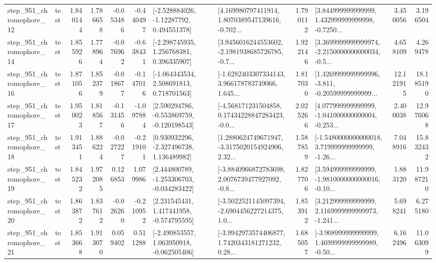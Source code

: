 \begin{tabular}{llrrrrllrlrr}
  step\_951\_chromophore\_12 &      test &      1.840144 &    1.786658 &     -0.053486 & -0.440497 &    [-2.528884026, -1.12287792, 0.494551378] &  [4.169980797411914, 1.8070389547139616, -0.702... &       1.790112 &  [3.844999999999999, 1.432999999999998, -0.7250... &            3.450056 &          3.196504 \\
  step\_951\_chromophore\_14 &      test &      1.855926 &    1.778964 &     -0.076962 & -0.638431 &    [-2.298745935, 1.256768381, 0.396335907] &  [3.9456016244553602, -2.1981938685726785, -0.7... &       1.922146 &  [3.3699999999999974, -2.2150000000000034, -0.5... &            4.658109 &          4.269478 \\
  step\_951\_chromophore\_16 &      test &      1.871056 &    1.852379 &     -0.018677 & -0.147016 &    [-1.064343534, 2.508691813, 0.718701563] &  [-1.6282403307334143, 3.966178783749066, 1.645... &       1.817030 &  [1.4269999999999996, -3.811, -0.20599999999999... &           12.121915 &         18.185190 \\
  step\_951\_chromophore\_17 &      test &      1.950023 &    1.818567 &     -0.131456 & -1.097884 &   [2.590294786, -0.553869759, -0.120198543] &  [-4.568171231504858, 0.17434228847283423, -0.0... &       2.025266 &  [4.077999999999999, -1.041000000000004, -0.253... &            2.400038 &         12.976068 \\
  step\_951\_chromophore\_18 &      test &      1.913451 &    1.886224 &     -0.027227 & -0.219101 &    [0.930932296, -2.327496738, 1.136489982] &  [1.2880624749671947, -3.3175020154924906, 2.32... &       1.587859 &  [-1.5480000000000018, 3.719999999999999, -1.26... &            7.048916 &         15.832432 \\
  step\_951\_chromophore\_19 &      test &      1.845232 &    1.972085 &      0.126853 &  1.079986 &   [2.444800789, -1.253306703, -0.034283422] &  [-3.8840966872783698, 2.0076739477927092, -0.8... &       1.827706 &  [3.594999999999999, -1.9810000000000016, -0.10... &            1.883120 &         11.987210 \\
  step\_951\_chromophore\_20 &      test &      1.863872 &    1.837612 &     -0.026260 & -0.210952 &    [2.231545431, 1.417441958, -0.574795595] &  [-3.5022521145097394, -2.6904456227214375, 1.0... &       1.853912 &  [3.212999999999999, 2.1169999999999973, -1.241... &            5.698241 &          6.275180 \\
  step\_951\_chromophore\_21 &      test &      1.853668 &    1.913070 &      0.059402 &  0.511288 &   [-2.490853557, 1.063950918, -0.062505406] &  [-3.9942973574406877, 1.7420343181271232, 0.28... &       1.685057 &  [-3.908999999999999, 1.4699999999999989, -0.50... &            6.162496 &         11.063099 \\

\end{tabular}
